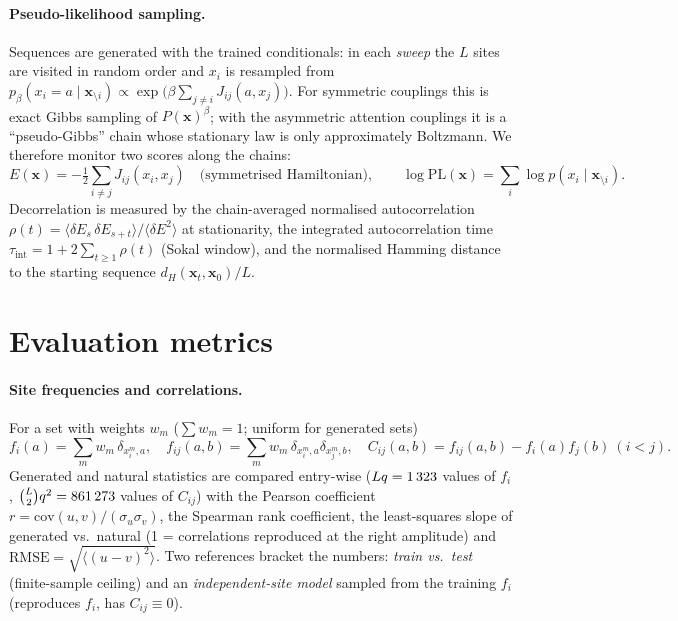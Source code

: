 \documentclass[10pt,a4paper]{article}
\begin{document}
\paragraph{Pseudo-likelihood sampling.}
Sequences are generated with the trained conditionals: in each \emph{sweep} the $L$ sites are
visited in random order and $x_i$ is resampled from
$p_\beta(x_i=a\mid\bm x_{\setminus i})\propto\exp\big(\beta\sum_{j\neq i}J_{ij}(a,x_j)\big)$.
For symmetric couplings this is exact Gibbs sampling of $P(\bm x)^\beta$; with the asymmetric
attention couplings it is a ``pseudo-Gibbs'' chain whose stationary law is only approximately
Boltzmann. We therefore monitor two scores along the chains:
\begin{equation}
E(\bm x)=-\tfrac12\sum_{i\neq j}J_{ij}(x_i,x_j)\quad\text{(symmetrised Hamiltonian)},\qquad
\log\mathrm{PL}(\bm x)=\sum_i\log p(x_i\mid\bm x_{\setminus i}).
\end{equation}
Decorrelation is measured by the chain-averaged normalised autocorrelation
$\rho(t)=\langle\delta E_s\,\delta E_{s+t}\rangle/\langle\delta E^2\rangle$ at stationarity, the integrated
autocorrelation time $\tau_\text{int}=1+2\sum_{t\ge1}\rho(t)$ (Sokal window), and the
normalised Hamming distance to the starting sequence $d_H(\bm x_t,\bm x_0)/L$.

\section{Evaluation metrics}\label{sec:metrics}
\paragraph{Site frequencies and correlations.} For a set with weights $w_m$ ($\sum w_m=1$; uniform for generated sets)
\begin{equation}
f_i(a)=\sum_m w_m\,\delta_{x^m_i,a},\quad
f_{ij}(a,b)=\sum_m w_m\,\delta_{x^m_i,a}\delta_{x^m_j,b},\quad
C_{ij}(a,b)=f_{ij}(a,b)-f_i(a)f_j(b)\ (i<j).
\end{equation}
Generated and natural statistics are compared entry-wise ($Lq=1\,323$ values of $f_i$,
$\binom L2 q^2=861\,273$ values of $C_{ij}$) with the Pearson coefficient
$r=\mathrm{cov}(u,v)/(\sigma_u\sigma_v)$, the Spearman rank coefficient, the least-squares
slope of generated vs.\ natural (1 = correlations reproduced at the right amplitude) and
$\text{RMSE}=\sqrt{\langle(u-v)^2\rangle}$. Two references bracket the numbers: \emph{train vs.\ test}
(finite-sample ceiling) and an \emph{independent-site model} sampled from the training $f_i$
(reproduces $f_i$, has $C_{ij}\equiv0$).
\end{document}
